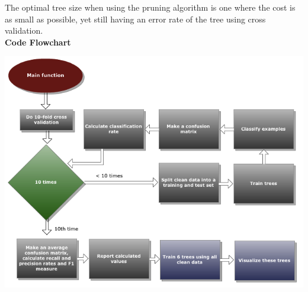 \documentclass[12pt]{article}
\begin{document}
The optimal tree size when using the pruning algorithm is one where the cost is as small as possible, yet still having an error rate of the tree using cross validation. \\

{\bf Code Flowchart} \\
\begin{center}
  \includegraphics[scale=0.6]{report-images/flowchart.png}
\end{center}
\end{document}
